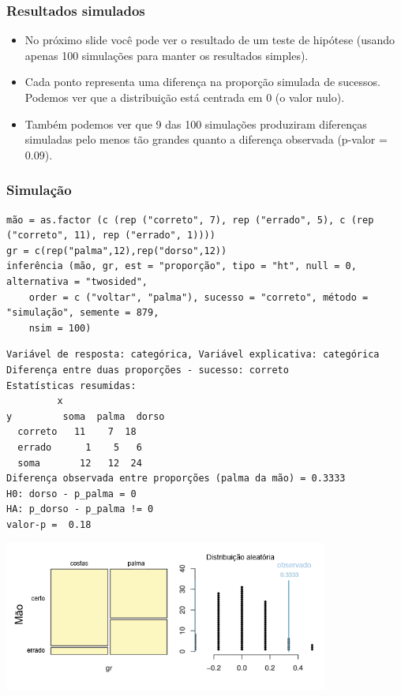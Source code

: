 
\begin{frame}
\frametitle{Resultados simulados}

\begin{itemize}
\justifying
\item No próximo slide você pode ver o resultado de um teste de hipótese (usando apenas 100 simulações para manter os resultados simples).
\justifying
\item Cada ponto representa uma diferença na proporção simulada de sucessos. Podemos ver que a distribuição está centrada em 0 (o valor nulo).
\justifying
\item Também podemos ver que 9 das 100 simulações produziram diferenças simuladas pelo menos tão grandes quanto a diferença observada (p-valor = 0.09).

\end{itemize}

\end{frame}


\begin{frame}[fragile]
\frametitle{Simulação}

{\tiny
\begin{Verbatim}[frame=single, formatcom=\color{blue}]
mão = as.factor (c (rep ("correto", 7), rep ("errado", 5), c (rep ("correto", 11), rep ("errado", 1))))
gr = c(rep("palma",12),rep("dorso",12))
inferência (mão, gr, est = "proporção", tipo = "ht", null = 0, alternativa = "twosided",
	order = c ("voltar", "palma"), sucesso = "correto", método = "simulação", semente = 879,
	nsim = 100)
\end{Verbatim}
}

\pause

{\tiny
\begin{Verbatim}[frame=single, formatcom=\color{gray}]
Variável de resposta: categórica, Variável explicativa: categórica
Diferença entre duas proporções - sucesso: correto
Estatísticas resumidas:
         x
y         soma  palma  dorso
  correto   11    7  18
  errado      1    5   6
  soma       12   12  24
Diferença observada entre proporções (palma da mão) = 0.3333
H0: dorso - p_palma = 0 
HA: p_dorso - p_palma != 0 
valor-p =  0.18 
\end{Verbatim}
}

\includegraphics[width=0.8\textwidth,height=0.3\textheight]{6-6_small_two_props/palm_back_HT.png}

\end{frame}

